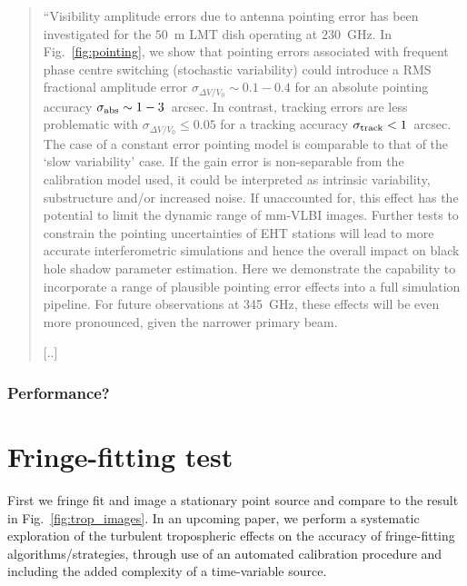 \begin{quotation}
``Visibility amplitude errors due to antenna pointing error has been investigated for the $50$~m  LMT dish operating at $230$~GHz. In Fig.~\ref{fig:pointing}, we show that pointing errors associated with frequent phase centre switching (stochastic variability) could introduce a RMS fractional amplitude error $\sigma_{\Delta V/V_0} \sim 0.1 - 0.4$ for an absolute pointing accuracy  $\sigma_{\rm abs} \sim 1-3$~arcsec. In contrast, tracking errors are less problematic with $\sigma_{\Delta V/V_0} \le 0.05$ for a tracking accuracy  $\sigma_{\rm track}<1$~arcsec. The case of a constant error pointing model is comparable to that of the `slow variability' case. If the gain error is non-separable from the calibration model used, it could be interpreted as intrinsic variability, substructure and/or increased noise. If unaccounted for, this effect has the potential to limit the dynamic range of mm-VLBI images. Further tests to constrain the pointing uncertainties of EHT stations will lead to more accurate interferometric simulations and hence the overall impact on black hole shadow parameter estimation. Here we demonstrate the capability to incorporate a range of plausible pointing error effects into a full simulation pipeline. For future observations at 345~GHz, these effects will be even more pronounced, given the narrower primary beam.

[..]
\\
\citep{Blecher_2016}
\end{quotation}


\subsubsection{Performance?}



\section{Fringe-fitting test}
First we fringe fit and image a stationary point source and compare to the result in Fig.~\ref{fig:trop_images}. 
 In an upcoming paper, we perform a systematic exploration of the turbulent tropospheric effects on the accuracy of fringe-fitting algorithms/strategies, through use of an automated calibration procedure and including the added complexity of a time-variable source.




